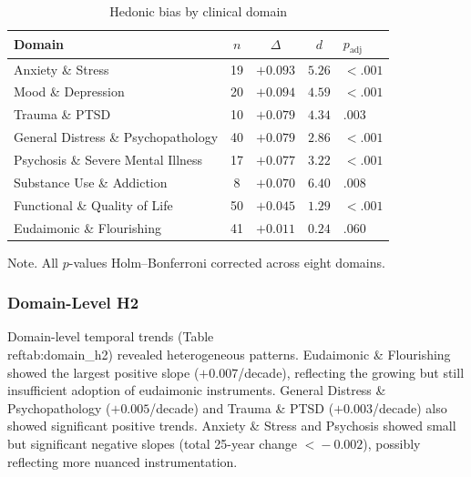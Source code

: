 \documentclass[12pt,a4paper]{article}
\newcommand{\floatnote}[1]{\par\vspace{4pt}\begin{minipage}{\linewidth}\small\textnormal{Note. #1}\end{minipage}}
\begin{document}
\begin{table}[H]
\centering
\caption{Hedonic bias by clinical domain}
\label{tab:domain_h1}
\small
\begin{tabular}{lcccl}
\toprule
\textbf{Domain} & \textbf{$n$} & \textbf{$\Delta$} & \textbf{$d$} & \textbf{$p_{\text{adj}}$} \\
\midrule
Anxiety \& Stress                       & 19 & $+0.093$ & $5.26$ & $< .001$ \\
Mood \& Depression                      & 20 & $+0.094$ & $4.59$ & $< .001$ \\
Trauma \& PTSD                          & 10 & $+0.079$ & $4.34$ & $.003$ \\
General Distress \& Psychopathology     & 40 & $+0.079$ & $2.86$ & $< .001$ \\
Psychosis \& Severe Mental Illness      & 17 & $+0.077$ & $3.22$ & $< .001$ \\
Substance Use \& Addiction              &  8 & $+0.070$ & $6.40$ & $.008$ \\
Functional \& Quality of Life           & 50 & $+0.045$ & $1.29$ & $< .001$ \\
Eudaimonic \& Flourishing               & 41 & $+0.011$ & $0.24$ & $.060$ \\
\bottomrule
\end{tabular}
\floatnote{All $p$-values Holm--Bonferroni corrected across eight domains.}
\end{table}

\subsubsection{Domain-Level H2}

Domain-level temporal trends (Table~\\ref{tab:domain_h2}) revealed heterogeneous patterns.
Eudaimonic \& Flourishing showed the largest positive slope ($+0.007$/decade), reflecting the growing but still insufficient adoption of eudaimonic instruments.
General Distress \& Psychopathology ($+0.005$/decade) and Trauma \& PTSD ($+0.003$/decade) also showed significant positive trends.
Anxiety \& Stress and Psychosis showed small but significant negative slopes (total 25-year change $<\!-0.002$), possibly reflecting more nuanced instrumentation.
\end{document}
